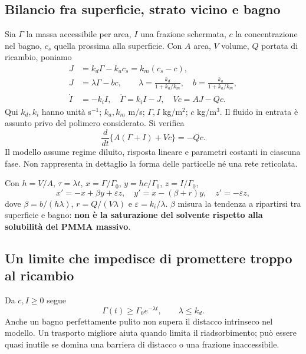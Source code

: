 \documentclass[11pt,reqno]{amsart}
\numberwithin{equation}{section}
\begin{document}
\subsection{Bilancio fra superficie, strato vicino e bagno}
Sia $\Gamma$ la massa accessibile per area, $I$ una frazione
schermata, $c$ la concentrazione nel bagno, $c_s$ quella prossima
alla superficie. Con $A$ area, $V$ volume, $Q$ portata di ricambio,
poniamo
\begin{align}
 J&=k_d\Gamma-k_a c_s=k_m(c_s-c),\label{eq:flux}\\
 J&=\lambda\Gamma-bc,\qquad
 \lambda=\frac{k_d}{1+k_a/k_m},\quad
 b=\frac{k_a}{1+k_a/k_m},\label{eq:effective}\\
 \dot I&=-k_iI,\quad
 \dot\Gamma=k_iI-J,\quad
 V\dot c=AJ-Qc.\label{eq:balance}
\end{align}
Qui $k_d,k_i$ hanno unit\`a s$^{-1}$; $k_a,k_m$ m/s;
$\Gamma,I$ kg/m$^2$; $c$ kg/m$^3$. Il fluido in entrata \`e
assunto privo del polimero considerato. Si verifica
\begin{equation}
 \frac{d}{dt}\{A(\Gamma+I)+Vc\}=-Qc.
\end{equation}
Il modello assume regime diluito, risposta lineare e parametri
costanti in ciascuna fase. Non rappresenta in dettaglio la forma
delle particelle n\'e una rete reticolata.

Con $h=V/A$, $\tau=\lambda t$, $x=\Gamma/\Gamma_0$,
$y=hc/\Gamma_0$, $z=I/\Gamma_0$,
\begin{equation}\label{eq:dimensionless}
 x'=-x+\beta y+\varepsilon z,\quad
 y'=x-(\beta+r)y,\quad z'=-\varepsilon z,
\end{equation}
dove $\beta=b/(h\lambda)$, $r=Q/(V\lambda)$ e
$\varepsilon=k_i/\lambda$. $\beta$ misura la tendenza a
ripartirsi tra superficie e bagno: \textbf{non \`e la saturazione
del solvente rispetto alla solubilit\`a del PMMA massivo}.

\subsection{Un limite che impedisce di promettere troppo al ricambio}
Da $c,I\ge0$ segue
\begin{equation}\label{eq:bound}
 \Gamma(t)\ge\Gamma_0e^{-\lambda t},\qquad \lambda\le k_d.
\end{equation}
Anche un bagno perfettamente pulito non supera il distacco
intrinseco nel modello. Un trasporto migliore aiuta quando limita
il riadsorbimento; pu\`o essere quasi inutile se domina una
barriera di distacco o una frazione inaccessibile.
\end{document}
